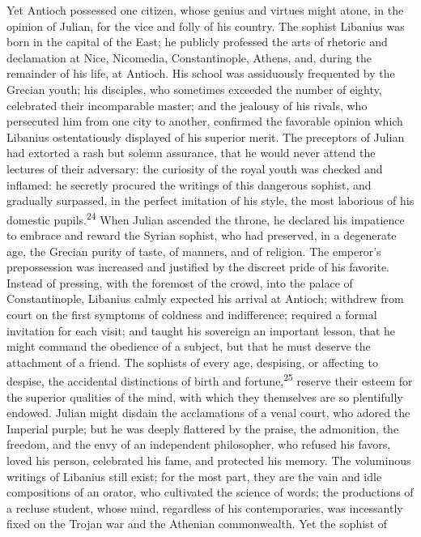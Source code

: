Yet Antioch possessed one citizen, whose genius and virtues might
atone, in the opinion of Julian, for the vice and folly of his
country. The sophist Libanius was born in the capital of the
East; he publicly professed the arts of rhetoric and declamation
at Nice, Nicomedia, Constantinople, Athens, and, during the
remainder of his life, at Antioch. His school was assiduously
frequented by the Grecian youth; his disciples, who sometimes
exceeded the number of eighty, celebrated their incomparable
master; and the jealousy of his rivals, who persecuted him from
one city to another, confirmed the favorable opinion which
Libanius ostentatiously displayed of his superior merit. The
preceptors of Julian had extorted a rash but solemn assurance,
that he would never attend the lectures of their adversary: the
curiosity of the royal youth was checked and inflamed: he
secretly procured the writings of this dangerous sophist, and
gradually surpassed, in the perfect imitation of his style, the
most laborious of his domestic pupils.\textsuperscript{24} When Julian ascended
the throne, he declared his impatience to embrace and reward the
Syrian sophist, who had preserved, in a degenerate age, the
Grecian purity of taste, of manners, and of religion. The
emperor’s prepossession was increased and justified by the
discreet pride of his favorite. Instead of pressing, with the
foremost of the crowd, into the palace of Constantinople,
Libanius calmly expected his arrival at Antioch; withdrew from
court on the first symptoms of coldness and indifference;
required a formal invitation for each visit; and taught his
sovereign an important lesson, that he might command the
obedience of a subject, but that he must deserve the attachment
of a friend. The sophists of every age, despising, or affecting
to despise, the accidental distinctions of birth and fortune,\textsuperscript{25}
reserve their esteem for the superior qualities of the mind, with
which they themselves are so plentifully endowed. Julian might
disdain the acclamations of a venal court, who adored the
Imperial purple; but he was deeply flattered by the praise, the
admonition, the freedom, and the envy of an independent
philosopher, who refused his favors, loved his person, celebrated
his fame, and protected his memory. The voluminous writings of
Libanius still exist; for the most part, they are the vain and
idle compositions of an orator, who cultivated the science of
words; the productions of a recluse student, whose mind,
regardless of his contemporaries, was incessantly fixed on the
Trojan war and the Athenian commonwealth. Yet the sophist of
